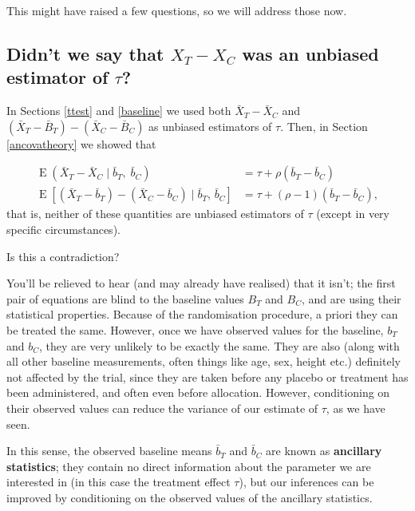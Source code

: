 \documentclass[
  openany]{book}
\theoremstyle{definition}
\theoremstyle{definition}
\theoremstyle{definition}
\theoremstyle{definition}
\theoremstyle{remark}
\begin{document}
This might have raised a few questions, so we will address those now.

\hypertarget{didnt-we-say-that-x_t---x_c-was-an-unbiased-estimator-of-tau}{%
\subsection{\texorpdfstring{Didn't we say that \(X_T - X_C\) was an unbiased estimator of \(\tau\)?}{Didn't we say that X\_T - X\_C was an unbiased estimator of \textbackslash tau?}}\label{didnt-we-say-that-x_t---x_c-was-an-unbiased-estimator-of-tau}}

In Sections \ref{ttest} and \ref{baseline} we used both \(\bar{X}_T - \bar{X}_C\) and \(\left(\bar{X}_T - \bar{B}_T\right) - \left(\bar{X}_C - \bar{B}_C\right)\) as unbiased estimators of \(\tau\).
Then, in Section \ref{ancovatheory} we showed that

\[
\begin{aligned}
\operatorname{E}\left(\bar{X}_T - \bar{X}_C\mid{\bar{b}_T,\;\bar{b}_C}\right)& = \tau + \rho\left(\bar{b}_T - \bar{b}_C\right)\\
\operatorname{E}\left[\left(\bar{X}_T - \bar{b}_T\right) - \left(\bar{X}_C - \bar{b}_C\right)\mid{\bar{b}_T,\,\bar{b}_C}\right] &= \tau + \left(\rho-1\right)\left(\bar{b}_T - \bar{b}_C\right),
\end{aligned}
\]
that is, neither of these quantities are unbiased estimators of \(\tau\) (except in very specific circumstances).

Is this a contradiction?

You'll be relieved to hear (and may already have realised) that it isn't; the first pair of equations are blind to the baseline values \(B_T\) and \(B_C\), and are using their statistical properties. Because of the randomisation procedure, a priori they can be treated the same. However, once we have observed values for the baseline, \(b_T\) and \(b_C\), they are very unlikely to be exactly the same. They are also (along with all other baseline measurements, often things like age, sex, height etc.) definitely not affected by the trial, since they are taken before any placebo or treatment has been administered, and often even before allocation. However, conditioning on their observed values can reduce the variance of our estimate of \(\tau\), as we have seen.

In this sense, the observed baseline means \(\bar{b}_T\) and \(\bar{b}_C\) are known as \textbf{ancillary statistics}; they contain no direct information about the parameter we are interested in (in this case the treatment effect \(\tau\)), but our inferences can be improved by conditioning on the observed values of the ancillary statistics.
\end{document}
